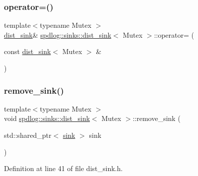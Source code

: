 \subsubsection{\texorpdfstring{operator=()}{operator=()}}
{\footnotesize\ttfamily template$<$typename Mutex $>$ \\
\hyperlink{classspdlog_1_1sinks_1_1dist__sink}{dist\+\_\+sink}\& \hyperlink{classspdlog_1_1sinks_1_1dist__sink}{spdlog\+::sinks\+::dist\+\_\+sink}$<$ Mutex $>$\+::operator= (\begin{DoxyParamCaption}\item[{const \hyperlink{classspdlog_1_1sinks_1_1dist__sink}{dist\+\_\+sink}$<$ Mutex $>$ \&}]{ }\end{DoxyParamCaption})\hspace{0.3cm}{\ttfamily [delete]}}

\mbox{\label{classspdlog_1_1sinks_1_1dist__sink_ac1537fdc6225fd57cc819e1fb9c5f8c7}} 
\subsubsection{\texorpdfstring{remove\+\_\+sink()}{remove\_sink()}}
{\footnotesize\ttfamily template$<$typename Mutex $>$ \\
void \hyperlink{classspdlog_1_1sinks_1_1dist__sink}{spdlog\+::sinks\+::dist\+\_\+sink}$<$ Mutex $>$\+::remove\+\_\+sink (\begin{DoxyParamCaption}\item[{std\+::shared\+\_\+ptr$<$ \hyperlink{classspdlog_1_1sinks_1_1sink}{sink} $>$}]{sink }\end{DoxyParamCaption})\hspace{0.3cm}{\ttfamily [inline]}}



Definition at line 41 of file dist\+\_\+sink.\+h.


